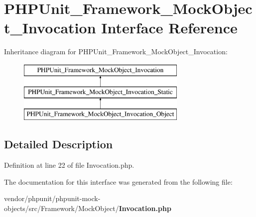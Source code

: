 \section{P\+H\+P\+Unit\+\_\+\+Framework\+\_\+\+Mock\+Object\+\_\+\+Invocation Interface Reference}
\label{interface_p_h_p_unit___framework___mock_object___invocation}
Inheritance diagram for P\+H\+P\+Unit\+\_\+\+Framework\+\_\+\+Mock\+Object\+\_\+\+Invocation\+:\begin{figure}[H]
\begin{center}
\leavevmode
\includegraphics[height=3.000000cm]{interface_p_h_p_unit___framework___mock_object___invocation}
\end{center}
\end{figure}


\subsection{Detailed Description}


Definition at line 22 of file Invocation.\+php.



The documentation for this interface was generated from the following file\+:\begin{DoxyCompactItemize}
\item 
vendor/phpunit/phpunit-\/mock-\/objects/src/\+Framework/\+Mock\+Object/{\bf Invocation.\+php}\end{DoxyCompactItemize}
